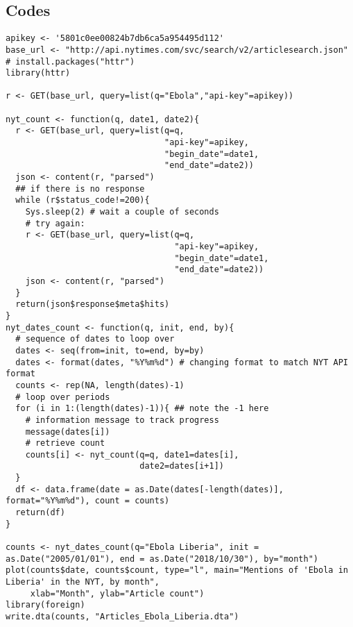\documentclass{article}
\begin{document}
\pagebreak

\subsection*{Codes}

\newsavebox\myv
\begin{lrbox}{\myv}\begin{minipage}{\textwidth}
\begin{verbatim}
apikey <- '5801c0ee00824b7db6ca5a954495d112'
base_url <- "http://api.nytimes.com/svc/search/v2/articlesearch.json"
# install.packages("httr")
library(httr)

r <- GET(base_url, query=list(q="Ebola","api-key"=apikey))

nyt_count <- function(q, date1, date2){
  r <- GET(base_url, query=list(q=q,
                                "api-key"=apikey,
                                "begin_date"=date1,
                                "end_date"=date2))
  json <- content(r, "parsed")
  ## if there is no response
  while (r$status_code!=200){
    Sys.sleep(2) # wait a couple of seconds
    # try again:
    r <- GET(base_url, query=list(q=q,
                                  "api-key"=apikey,
                                  "begin_date"=date1,
                                  "end_date"=date2))
    json <- content(r, "parsed")
  }
  return(json$response$meta$hits)
}
nyt_dates_count <- function(q, init, end, by){
  # sequence of dates to loop over
  dates <- seq(from=init, to=end, by=by)
  dates <- format(dates, "%Y%m%d") # changing format to match NYT API format
  counts <- rep(NA, length(dates)-1)
  # loop over periods
  for (i in 1:(length(dates)-1)){ ## note the -1 here
    # information message to track progress
    message(dates[i])
    # retrieve count
    counts[i] <- nyt_count(q=q, date1=dates[i],
                           date2=dates[i+1])
  }
  df <- data.frame(date = as.Date(dates[-length(dates)], format="%Y%m%d"), count = counts)
  return(df)
}

counts <- nyt_dates_count(q="Ebola Liberia", init = as.Date("2005/01/01"), end = as.Date("2018/10/30"), by="month")
plot(counts$date, counts$count, type="l", main="Mentions of 'Ebola in Liberia' in the NYT, by month",
     xlab="Month", ylab="Article count")
library(foreign)
write.dta(counts, "Articles_Ebola_Liberia.dta")
\end{verbatim}
\end{minipage}\end{lrbox}
\resizebox{0.65\textwidth}{!}{\usebox\myv}
\end{document}
